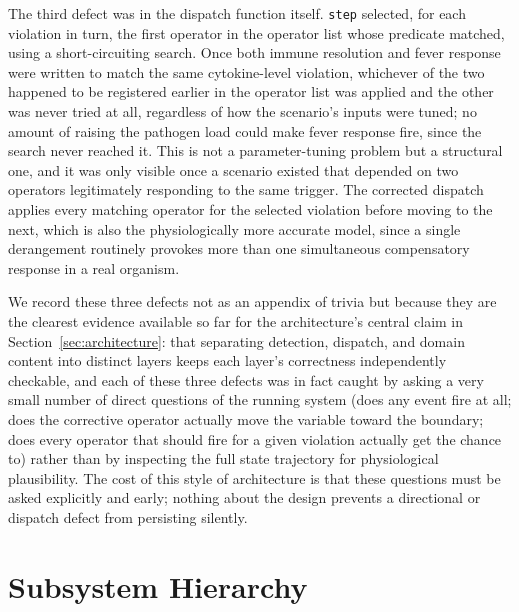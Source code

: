 \documentclass[11pt]{article}
\begin{document}
The third defect was in the dispatch function itself. \texttt{step} selected, for each violation in turn, the first operator in the operator list whose predicate matched, using a short-circuiting search. Once both immune resolution and fever response were written to match the same cytokine-level violation, whichever of the two happened to be registered earlier in the operator list was applied and the other was never tried at all, regardless of how the scenario's inputs were tuned; no amount of raising the pathogen load could make fever response fire, since the search never reached it. This is not a parameter-tuning problem but a structural one, and it was only visible once a scenario existed that depended on two operators legitimately responding to the same trigger. The corrected dispatch applies every matching operator for the selected violation before moving to the next, which is also the physiologically more accurate model, since a single derangement routinely provokes more than one simultaneous compensatory response in a real organism.

We record these three defects not as an appendix of trivia but because they are the clearest evidence available so far for the architecture's central claim in Section~\ref{sec:architecture}: that separating detection, dispatch, and domain content into distinct layers keeps each layer's correctness independently checkable, and each of these three defects was in fact caught by asking a very small number of direct questions of the running system (does any event fire at all; does the corrective operator actually move the variable toward the boundary; does every operator that should fire for a given violation actually get the chance to) rather than by inspecting the full state trajectory for physiological plausibility. The cost of this style of architecture is that these questions must be asked explicitly and early; nothing about the design prevents a directional or dispatch defect from persisting silently.

\section{Subsystem Hierarchy}
\label{sec:roadmap}
\end{document}

